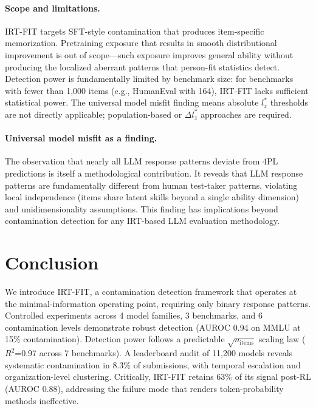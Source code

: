 \documentclass[11pt,a4paper]{article}
\begin{document}
\paragraph{Scope and limitations.}
IRT-FIT targets SFT-style contamination that produces item-specific memorization.
Pretraining exposure that results in smooth distributional improvement is out of scope---such exposure improves general ability without producing the localized aberrant patterns that person-fit statistics detect.
Detection power is fundamentally limited by benchmark size: for benchmarks with fewer than 1,000 items (e.g., HumanEval with 164), IRT-FIT lacks sufficient statistical power.
The universal model misfit finding means absolute $l_{z}^{*}$ thresholds are not directly applicable; population-based or $\Delta l_{z}^{*}$ approaches are required.

\paragraph{Universal model misfit as a finding.}
The observation that nearly all LLM response patterns deviate from 4PL predictions is itself a methodological contribution.
It reveals that LLM response patterns are fundamentally different from human test-taker patterns, violating local independence (items share latent skills beyond a single ability dimension) and unidimensionality assumptions.
This finding has implications beyond contamination detection for any IRT-based LLM evaluation methodology.

\section{Conclusion}

We introduce IRT-FIT, a contamination detection framework that operates at the minimal-information operating point, requiring only binary response patterns.
Controlled experiments across 4 model families, 3 benchmarks, and 6 contamination levels demonstrate robust detection (AUROC 0.94 on MMLU at 15\% contamination).
Detection power follows a predictable $\sqrt{n_{\text{items}}}$ scaling law ($R^{2}$=0.97 across 7 benchmarks).
A leaderboard audit of 11,200 models reveals systematic contamination in 8.3\% of submissions, with temporal escalation and organization-level clustering.
Critically, IRT-FIT retains 63\% of its signal post-RL (AUROC 0.88), addressing the failure mode that renders token-probability methods ineffective.
\end{document}
